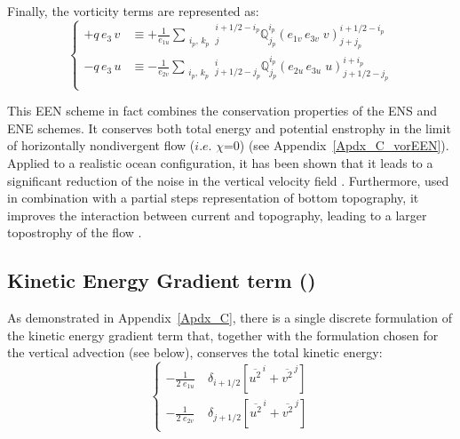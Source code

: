 Finally, the vorticity terms are represented as: 
\begin{equation} \label{Eq_dynvor_een}
\left\{ {
\begin{aligned}
 +q\,e_3 \, v 	&\equiv +\frac{1}{e_{1u} }   \sum_{\substack{i_p,\,k_p}} 
                         {^{i+1/2-i_p}_j}  \mathbb{Q}^{i_p}_{j_p}  \left( e_{1v}\,e_{3v} \;v  \right)^{i+1/2-i_p}_{j+j_p}   \\
 - q\,e_3 \, u     &\equiv -\frac{1}{e_{2v} }    \sum_{\substack{i_p,\,k_p}} 
                         {^i_{j+1/2-j_p}}  \mathbb{Q}^{i_p}_{j_p}  \left( e_{2u}\,e_{3u} \;u  \right)^{i+i_p}_{j+1/2-j_p}   \\
\end{aligned} 
} \right.
\end{equation} 

This EEN scheme in fact combines the conservation properties of the ENS and ENE schemes. 
It conserves both total energy and potential enstrophy in the limit of horizontally 
nondivergent flow ($i.e.$ $\chi$=$0$) (see  Appendix~\ref{Apdx_C_vorEEN}). 
Applied to a realistic ocean configuration, it has been shown that it leads to a significant 
reduction of the noise in the vertical velocity field \citep{Le_Sommer_al_OM09}. 
Furthermore, used in combination with a partial steps representation of bottom topography,
it improves the interaction between current and topography, leading to a larger
topostrophy of the flow  \citep{Barnier_al_OD06, Penduff_al_OS07}. 

\subsection   [Kinetic Energy Gradient term (\textit{dynkeg})]
			{Kinetic Energy Gradient term ()}
\label{DYN_keg}

As demonstrated in Appendix~\ref{Apdx_C}, there is a single discrete formulation 
of the kinetic energy gradient term that, together with the formulation chosen for 
the vertical advection (see below), conserves the total kinetic energy:
\begin{equation} \label{Eq_dynkeg}
\left\{ \begin{aligned}
 -\frac{1}{2 \; e_{1u} }  & \ \delta _{i+1/2} \left[ {\overline {u^2}^{\,i} + \overline{v^2}^{\,j}} \right]   \\
 -\frac{1}{2 \; e_{2v} }  & \ \delta _{j+1/2} \left[ {\overline {u^2}^{\,i} + \overline{v^2}^{\,j}} \right]    
\end{aligned} \right.
\end{equation} 

